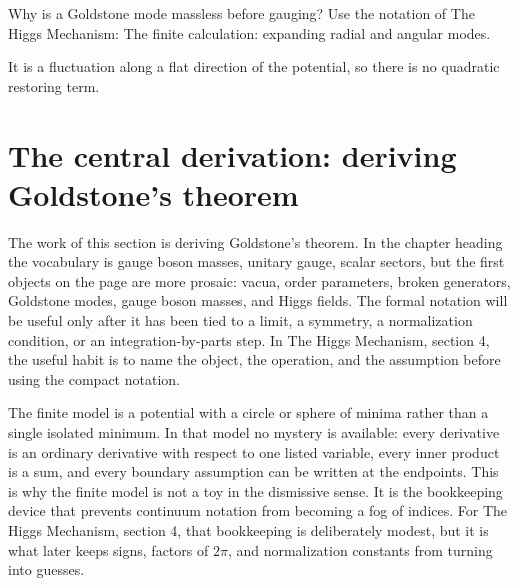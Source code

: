 \begin{exercise}
Why is a Goldstone mode massless before gauging?  Use the notation of The Higgs Mechanism: The finite calculation: expanding radial and angular modes.
\begin{answer}
It is a fluctuation along a flat direction of the potential, so there is no quadratic restoring term.
\end{answer}
\end{exercise}



\section{The central derivation: deriving Goldstone's theorem}













The work of this section is deriving Goldstone's theorem.  In the chapter heading the vocabulary is gauge boson masses, unitary gauge, scalar sectors, but the first objects on the page are more prosaic: vacua, order parameters, broken generators, Goldstone modes, gauge boson masses, and Higgs fields.  The formal notation will be useful only after it has been tied to a limit, a symmetry, a normalization condition, or an integration-by-parts step.  In The Higgs Mechanism, section 4, the useful habit is to name the object, the operation, and the assumption before using the compact notation.

The finite model is a potential with a circle or sphere of minima rather than a single isolated minimum.  In that model no mystery is available: every derivative is an ordinary derivative with respect to one listed variable, every inner product is a sum, and every boundary assumption can be written at the endpoints.  This is why the finite model is not a toy in the dismissive sense.  It is the bookkeeping device that prevents continuum notation from becoming a fog of indices.  For The Higgs Mechanism, section 4, that bookkeeping is deliberately modest, but it is what later keeps signs, factors of \(2\pi\), and normalization constants from turning into guesses.

